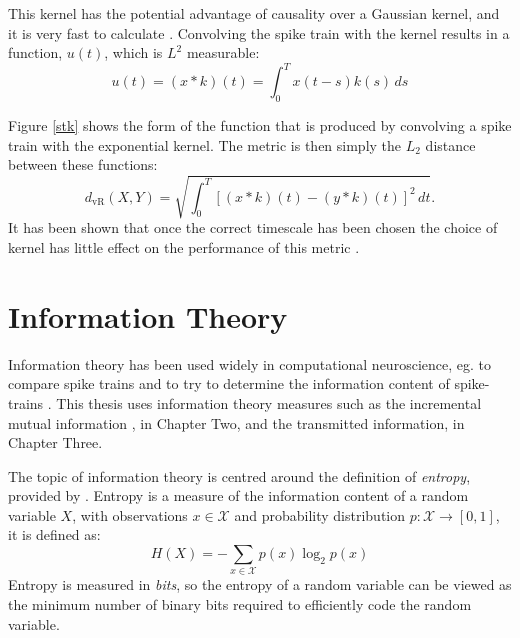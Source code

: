 This kernel has the potential advantage of causality over a 
Gaussian kernel, and it is very fast to calculate \citep{HoughtonKreuz2012a}.   Convolving the spike 
train with the kernel results in a function, $u(t)$, which is $L^2$ measurable:
\begin{equation}
u(t) = (x*k)(t) = \int_0^T x(t-s)k(s)\,ds
\end{equation}




Figure \ref{stk} shows the form of the function that is produced by
convolving a spike train with the exponential kernel.  The metric is then simply the $L_2$ distance between these functions:
\begin{equation}
d_{\text{vR}}(X,Y) =  \sqrt{\int_0^T \left[(x*k)(t) - (y*k)(t) \right]^2\,dt}.
\end{equation}
It has been shown that once the correct timescale has been chosen the choice of kernel has 
little effect on the performance of this metric \citep{HoughtonVictor2009a}.



\section{Information Theory}
Information theory has been used widely in computational neuroscience, eg. to compare spike trains \citep{BialekEtAl1998a} and to try to determine the information content of spike-trains \citep{GillespieHoughton2009a}. This thesis uses information theory measures such as the incremental mutual information \citep{SinghLesica2010a}, in Chapter Two, and the transmitted information, in Chapter Three.

The topic of information theory is centred around the definition of \emph{entropy}, provided by \citet{Shannon1948a}.  Entropy is a measure of the information content of a random variable $X$, with observations $x \in \mathcal{X}$ and probability distribution $p:\mathcal{X} \rightarrow [0,1]$, it is defined as:
\begin{equation}
H(X) = -\sum_{x\in\mathcal{X}}  p(x) \log_2 p(x)
\end{equation}
Entropy is measured in \emph{bits}, so the entropy of a random variable can be viewed as the minimum number of binary bits required to efficiently code the random variable.

